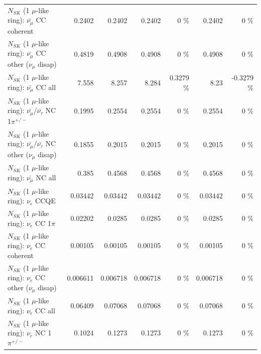 \begin{table}
\begin{tabular}{| l | r | r | r  r | r  r |}
                       $N_{SK}$ (1 $\mu$-like ring): $\bar{\nu_\mu}$ CC coherent &          0.2402 &          0.2402 &          0.2402 &        0 \%  &          0.2402 &        0 \%  \\ 
        $N_{SK}$ (1 $\mu$-like ring): $\bar{\nu_\mu}$ CC other ($\nu_\mu$ disap) &          0.4819 &          0.4908 &          0.4908 &        0 \%  &          0.4908 &        0 \%  \\ 
                          $N_{SK}$ (1 $\mu$-like ring): $\bar{\nu_{\mu}}$ CC all &           7.558 &           8.257 &           8.284 &   0.3279 \%  &            8.23 &  -0.3279 \%  \\ 
\hline
  $N_{SK}$ (1 $\mu$-like ring): $\bar{\nu_\mu}$/$\bar{\nu_\tau}$ NC 1$\pi^{+/-}$ &          0.1995 &          0.2554 &          0.2554 &        0 \%  &          0.2554 &        0 \%  \\ 
$N_{SK}$ (1 $\mu$-like ring): $\bar{\nu_\mu}$/$\bar{\nu_\tau}$ NC other ($\nu_\mu$ disap) &          0.1855 &          0.2015 &          0.2015 &        0 \%  &          0.2015 &        0 \%  \\ 
                          $N_{SK}$ (1 $\mu$-like ring): $\bar{\nu_{\mu}}$ NC all &           0.385 &          0.4568 &          0.4568 &        0 \%  &          0.4568 &        0 \%  \\ 
\hline
\hline
\hline
                                      $N_{SK}$ (1 $\mu$-like ring): $\nu_e$ CCQE &         0.03442 &         0.03442 &         0.03442 &        0 \%  &         0.03442 &        0 \%  \\ 
                                 $N_{SK}$ (1 $\mu$-like ring): $\nu_e$ CC 1$\pi$ &         0.02202 &          0.0285 &          0.0285 &        0 \%  &          0.0285 &        0 \%  \\ 
                               $N_{SK}$ (1 $\mu$-like ring): $\nu_e$ CC coherent &         0.00105 &         0.00105 &         0.00105 &        0 \%  &         0.00105 &        0 \%  \\ 
                $N_{SK}$ (1 $\mu$-like ring): $\nu_e$ CC other ($\nu_\mu$ disap) &        0.006611 &        0.006718 &        0.006718 &        0 \%  &        0.006718 &        0 \%  \\ 
                                  $N_{SK}$ (1 $\mu$-like ring): $\nu_{e}$ CC all &         0.06409 &         0.07068 &         0.07068 &        0 \%  &         0.07068 &        0 \%  \\ 
\hline
                           $N_{SK}$ (1 $\mu$-like ring): $\nu_e$ NC 1$\pi^{+/-}$ &          0.1024 &          0.1273 &          0.1273 &        0 \%  &          0.1273 &        0 \%  \\ 

\end{tabular}
\end{table}
